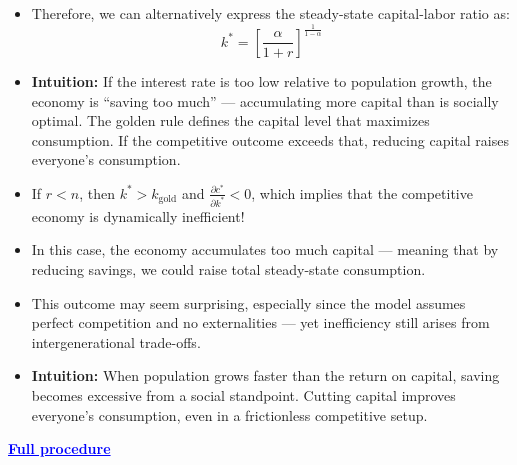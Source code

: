 \documentclass[12pt]{article}
\begin{document}
\begin{itemize}
\item Therefore, we can alternatively express the steady-state capital-labor ratio as:
\[
k^* = \left[ \frac{\alpha}{1 + r} \right]^{\frac{1}{1 - \alpha}}
\]

\item \textbf{Intuition:} If the interest rate is too low relative to population growth, the economy is “saving too much” — accumulating more capital than is socially optimal. The golden rule defines the capital level that maximizes consumption. If the competitive outcome exceeds that, reducing capital raises everyone’s consumption.
\end{itemize}

\begin{itemize}
\item If \( r < n \), then \( k^* > k_{\text{gold}} \) and \( \frac{\partial c^*}{\partial k^*} < 0 \), which implies that the competitive economy is dynamically inefficient!

\item In this case, the economy accumulates too much capital — meaning that by reducing savings, we could raise total steady-state consumption.

\item This outcome may seem surprising, especially since the model assumes perfect competition and no externalities — yet inefficiency still arises from intergenerational trade-offs.

\item \textbf{Intuition:} When population grows faster than the return on capital, saving becomes excessive from a social standpoint. Cutting capital improves everyone’s consumption, even in a frictionless competitive setup.
\end{itemize}

\textcolor{blue}{\textbf{\uline{Full procedure}}}
\end{document}
